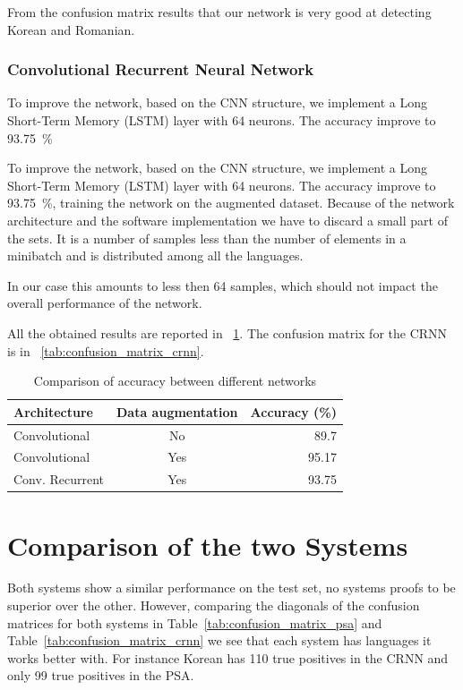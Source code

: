 \documentclass{article}
\begin{document}
From the confusion matrix results that our network is very good at detecting Korean and Romanian.

\subsubsection{Convolutional Recurrent Neural Network}
To improve the network, based on the CNN structure, we implement a Long Short-Term Memory (LSTM) layer with 64 neurons. The accuracy improve to \SI{93.75}{\percent}

To improve the network, based on the CNN structure, we implement a Long Short-Term Memory (LSTM) layer with 64 neurons. 
The accuracy improve to \SI{93.75}{\percent}, training the network on the augmented dataset.
Because of the network architecture and the software implementation we have to discard a small part of the sets. It is a number of samples less than the number of elements in a minibatch and is distributed among all the languages.

In our case this amounts to less then 64 samples, which should not impact the overall performance of the network.

All the obtained results are reported in \tablename~\ref{tab:dnn-acc-comp}. The confusion matrix for the CRNN is in \tablename~\ref{tab:confusion_matrix_crnn}.

\begin{table}
  \centering
  \begin{tabular}{lcr}
    \toprule
    Architecture & Data augmentation & Accuracy (\si{\percent}) \\
    \midrule
    Convolutional & No & 89.7 \\
    Convolutional & Yes & 95.17 \\
    Conv. Recurrent & Yes & 93.75 \\
    \bottomrule
  \end{tabular}
  \caption{Comparison of accuracy between different networks}\label{tab:dnn-acc-comp}
\end{table}

\section{Comparison of the two Systems}
\label{sec:comparision}

Both systems show a similar performance on the test set, no systems proofs to be superior over the other. However, comparing the diagonals of the confusion matrices for both systems in Table~\ref{tab:confusion_matrix_psa} and Table~\ref{tab:confusion_matrix_crnn} we see that each system has languages it works better with. For instance Korean has 110 true positives in the CRNN and only 99 true positives in the PSA.
\end{document}
